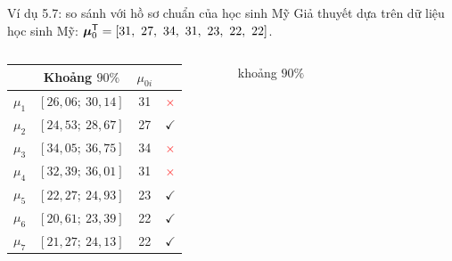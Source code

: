 \begin{frame}{Ví dụ 5.7: so sánh với hồ sơ chuẩn của học sinh Mỹ}
  Giả thuyết dựa trên dữ liệu học sinh Mỹ:
  \(\vect{\mu}_0\trans=[31,\ 27,\ 34,\ 31,\ 23,\ 22,\ 22]\).
  \begin{columns}[T,onlytextwidth]
    \begin{center}
      \small
      \renewcommand{\arraystretch}{1.05}
      \begin{tabular}{@{}lccc@{}}
        \toprule
        & Khoảng \(90\%\) & \(\mu_{0i}\) & \\
        \midrule
        \(\mu_1\) & \([26{,}06;\ 30{,}14]\) & 31 & \textcolor{red}{\(\times\)} \\
        \(\mu_2\) & \([24{,}53;\ 28{,}67]\) & 27 & \(\checkmark\) \\
        \(\mu_3\) & \([34{,}05;\ 36{,}75]\) & 34 & \textcolor{red}{\(\times\)} \\
        \(\mu_4\) & \([32{,}39;\ 36{,}01]\) & 31 & \textcolor{red}{\(\times\)} \\
        \(\mu_5\) & \([22{,}27;\ 24{,}93]\) & 23 & \(\checkmark\) \\
        \(\mu_6\) & \([20{,}61;\ 23{,}39]\) & 22 & \(\checkmark\) \\
        \(\mu_7\) & \([21{,}27;\ 24{,}13]\) & 22 & \(\checkmark\) \\
        \bottomrule
      \end{tabular}
    \end{center}
    \centering
    \\[0.1cm]
    {\scriptsize \textcolor{hustprimary}{\rule[0.5ex]{0.5cm}{1.6pt}} khoảng \(90\%\)
}
\end{columns}
\end{frame}
